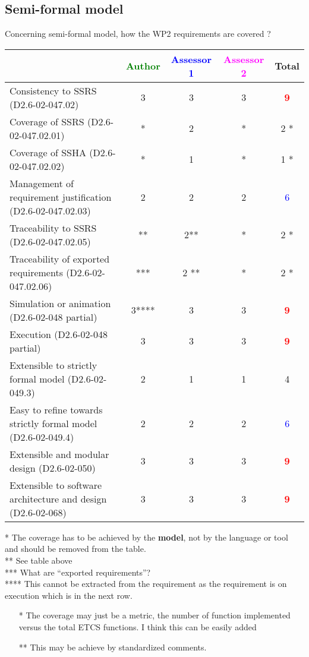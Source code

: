 \subsection{Semi-formal model}

Concerning semi-formal model, how the WP2 requirements are covered ?

\begin{tabular}{|l | c | c | c | c|}
\hline
& \textcolor{green}{Author} & \textcolor{blue}{Assessor 1} & \textcolor{magenta}{Assessor 2} & Total \\
\hline
Consistency to SSRS (D2.6-02-047.02) &3 &3 &3 & \textcolor{red}{\textbf{9}} \\
\hline
Coverage of SSRS (D2.6-02-047.02.01) &* &2 &* & 2   * \\
\hline
Coverage of SSHA (D2.6-02-047.02.02) &* &1 &* & 1   * \\
\hline
Management of requirement justification (D2.6-02-047.02.03) &2 &2 &2 & \textcolor{blue}{6} \\
\hline
Traceability to SSRS (D2.6-02-047.02.05) &** &2** &* & 2   * \\
\hline
Traceability of exported requirements (D2.6-02-047.02.06) &*** & 2   **&* & 2   * \\
\hline
Simulation or animation (D2.6-02-048 partial) &3**** & 3    &3 & \textcolor{red}{\textbf{9}} \\
\hline
Execution (D2.6-02-048 partial) &3 &3 &3 & \textcolor{red}{\textbf{9}} \\
\hline
Extensible to strictly formal model (D2.6-02-049.3) &2 &1 &1 & 4    \\
\hline
Easy to refine towards strictly formal model (D2.6-02-049.4) &2 &2 &2 & \textcolor{blue}{6} \\
\hline
Extensible and modular design (D2.6-02-050) &3 &3 &3 & \textcolor{red}{\textbf{9}} \\
\hline
Extensible to software architecture and design (D2.6-02-068) &3 &3 &3 & \textcolor{red}{\textbf{9}} \\
\hline
\end{tabular}

\begin{author_comment}
* The coverage has to be achieved by the \textbf{model}, not by the language or tool and should be removed from the table.\\
** See table above\\
*** What are ``exported requirements''?\\
**** This cannot be extracted from the requirement as the requirement is on execution which is in the next row.
\end{author_comment}
\begin{assessor1}
\begin{itemize}
\item[*] The coverage may just be a metric, the number of function
  implemented versus the total ETCS functions. I think this can be
  easily added
\item[**] This may be achieve by standardized comments.
\end{itemize}
\end{assessor1}

